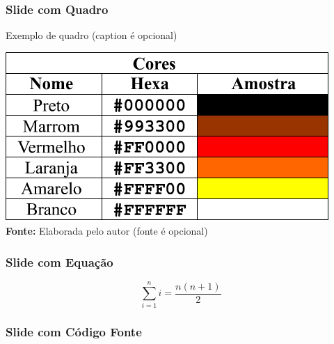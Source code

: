 \begin{frame}

    \frametitle{Slide com Quadro}
    
    \begin{quadro}[!htbp]
       	\centering
       	\caption{Exemplo de quadro (caption é opcional)}
       	\includegraphics[scale=.3]{imagens/exemploQuadro}
        \\ \vspace{0.2cm}
       	\small{\textbf{Fonte:} Elaborada pelo autor (fonte é opcional)}%
    \end{quadro}
         
\end{frame}


\begin{frame}

    \frametitle{Slide com Equação}
    
    \begin{equation}
        \sum_{i=1}^{n} i = \frac{n(n+1)}{2}
        \label{eq:exemplo}
    \end{equation}
         
\end{frame}


\begin{frame}

    \frametitle{Slide com Código Fonte}
    
    \centering
    \resizebox{10cm}{!}{%
         
    }
    
\end{frame}


